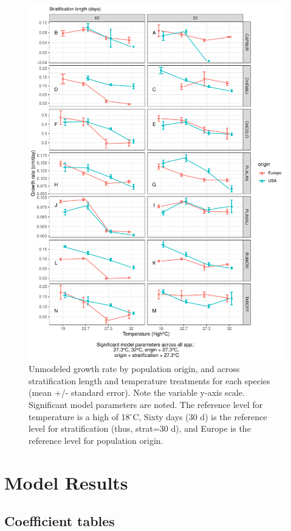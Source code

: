 \documentclass[12pt]{article}\usepackage[]{graphicx}\usepackage[]{color}
\begin{document}
\begin{figure}[H]
  \centering
  \includegraphics[scale=.8]{figure9} %
  \caption{Unmodeled growth rate by population origin, and across stratification length and temperature treatments for each   species (mean +/- standard error). Note the variable y-axis scale. Significant model parameters are noted. The reference level for temperature is a high of 18$^\circ$C, Sixty days (30 d) is the reference level for stratification (thus, strat=30 d), and Europe is the reference level for population origin. } \label{fig:rawgrowth} 
\end{figure}

\section{Model Results}
\subsection{Coefficient tables}
\end{document}

